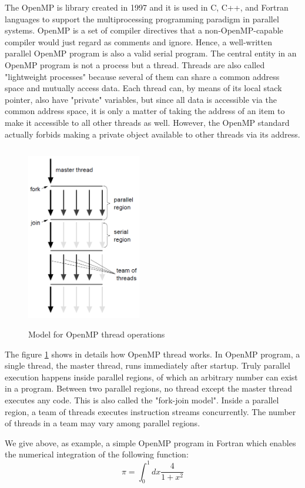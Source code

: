The OpenMP is library created in 1997 and it is used in C, C++, and Fortran languages to support the multiprocessing programming paradigm in parallel systems. OpenMP is a set of compiler directives that a non-OpenMP-capable compiler would just regard as comments and ignore. Hence, a well-written parallel OpenMP program is also a valid serial program. The central entity in an OpenMP program is not a process but a thread. Threads are also called "lightweight processes" because several of them can share
a common address space and mutually access data. Each thread can, by means of its local stack pointer, also have "private"
variables, but since all data is accessible via the common address space, it is only a matter of taking the address of an item to make it accessible to all other threads as well. However, the OpenMP standard actually forbids making a private object available to other threads via its address.
\begin{figure}[!h]
\centering 
\includegraphics[height=8cm,width=5cm]{images/OpenMP.png}
\caption{Model for OpenMP thread operations}
\label{OpenMP} 
\end{figure}

The figure \ref{OpenMP} shows in details how OpenMP thread works. In OpenMP program, a single thread, the master thread, runs immediately after startup. Truly parallel execution happens inside parallel regions, of which an arbitrary number can exist in a program. Between two parallel regions, no thread except the master thread executes any code. This is also called the "fork-join model". Inside a parallel region, a team of threads executes instruction streams concurrently. The number of threads in a team may vary among parallel regions. 

We give above, as example, a simple OpenMP program in Fortran which enables the numerical integration of the following function:
\begin{equation}\label{pi}
\pi = \int_{0}^{1}dx \frac{4}{1+x^2}
\end{equation}

